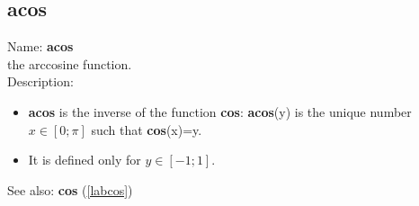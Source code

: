 \subsection{acos}
\label{labacos}
\noindent Name: \textbf{acos}\\
the arccosine function.\\

\noindent Description: \begin{itemize}

\item \textbf{acos} is the inverse of the function \textbf{cos}: \textbf{acos}(y) is the unique number 
   $x \in [0; \pi]$ such that \textbf{cos}(x)=y.

\item It is defined only for $y \in [-1;1]$.
\end{itemize}
See also: \textbf{cos} (\ref{labcos})
